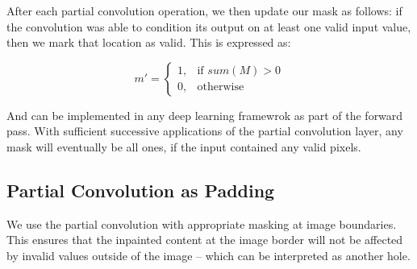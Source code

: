 \documentclass[conference]{IEEEtran}
\begin{document}
After each partial convolution operation, we then update our mask as follows:
if the convolution was able to condition its output on at least one valid input value, then we mark that location as valid. This is expressed as:

\begin{equation}
{m}' = \begin{cases}
1, & \text{if } sum(M) > 0 \\
0, & \text{otherwise}
\end{cases}
\end{equation}

And can be implemented in any deep learning framewrok as part of the forward pass. With sufficient successive applications of the partial convolution layer, any mask will eventually be all ones, if the input contained any valid pixels.

\subsection{Partial Convolution as Padding}
We use the partial convolution with
appropriate masking at image boundaries. This ensures
that the inpainted content at the image border will not be affected by invalid values outside of the image – which can be interpreted as another hole.
\end{document}
